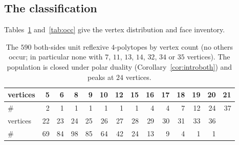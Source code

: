 \documentclass[11pt]{amsart}
\theoremstyle{definition}
\theoremstyle{remark}
\begin{document}
\subsection{The classification}
Tables~\ref{tab:dist} and~\ref{tab:occ} give the vertex distribution and
face inventory.
\begin{table}[ht]
\centering
\begin{tabular}{lrrrrrrrrrrrrr}
\toprule
vertices & 5 & 6 & 8 & 9 & 10 & 12 & 15 & 16 & 17 & 18 & 19 & 20 & 21\\
\midrule
\# & 2 & 1 & 1 & 1 & 1 & 1 & 1 & 4 & 4 & 7 & 12 & 24 & 37\\
\midrule
vertices & 22 & 23 & 24 & 25 & 26 & 27 & 28 & 29 & 30 & 31 & 33 & 36 &\\
\midrule
\# & 69 & 84 & 98 & 85 & 64 & 42 & 24 & 13 & 9 & 4 & 1 & 1 &\\
\bottomrule
\end{tabular}
\medskip
\caption{The $590$ both-sides unit reflexive $4$-polytopes by vertex count
(no others occur; in particular none with $7$, $11$, $13$, $14$, $32$, $34$
or $35$ vertices).  The population is closed under polar duality
(Corollary~\textup{\ref{cor:introboth}}) and peaks at $24$
vertices.}\label{tab:dist}
\end{table}
\end{document}
